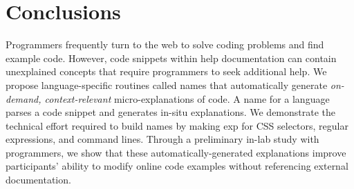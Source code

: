 \section{Conclusions}

Programmers frequently turn to the web to solve coding problems and find example code.
However, code snippets within  help documentation can contain unexplained concepts that require programmers to seek additional help.
We propose language-specific routines called \Glspl{name} that automatically generate \emph{on-demand, context-relevant} micro-explanations of code.
A \gls{name} for a language parses a code snippet and generates in-situ  explanations.
We demonstrate the technical effort required to build \glspl{name} by making \gls{exp} for CSS selectors, regular expressions, and command lines.
Through a preliminary in-lab study with   programmers, we show that these automatically-generated explanations improve participants' ability to modify online code examples without referencing external documentation.